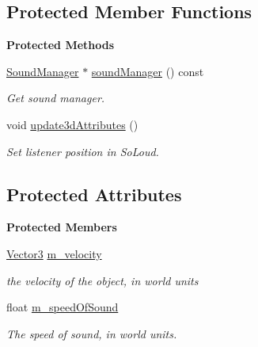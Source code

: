 \subsection*{Protected Member Functions}
\begin{Indent}\textbf{ Protected Methods}\par
\begin{DoxyCompactItemize}
\item 
\mbox{\label{classrev_1_1_audio_listener_component_a91da244fde04a60734fb0646785d573a}} 
\mbox{\hyperlink{classrev_1_1_sound_manager}{Sound\+Manager}} $\ast$ \mbox{\hyperlink{classrev_1_1_audio_listener_component_a91da244fde04a60734fb0646785d573a}{sound\+Manager}} () const
\begin{DoxyCompactList}\small\item\em Get sound manager. \end{DoxyCompactList}\item 
\mbox{\label{classrev_1_1_audio_listener_component_a1874d366bcf120fe0088e0936dda63a7}} 
void \mbox{\hyperlink{classrev_1_1_audio_listener_component_a1874d366bcf120fe0088e0936dda63a7}{update3d\+Attributes}} ()
\begin{DoxyCompactList}\small\item\em Set listener position in So\+Loud. \end{DoxyCompactList}\end{DoxyCompactItemize}
\end{Indent}
\subsection*{Protected Attributes}
\begin{Indent}\textbf{ Protected Members}\par
\begin{DoxyCompactItemize}
\item 
\mbox{\label{classrev_1_1_audio_listener_component_a833bfdf2c3435f29115e6a51dfbde74c}} 
\mbox{\hyperlink{classrev_1_1_vector}{Vector3}} \mbox{\hyperlink{classrev_1_1_audio_listener_component_a833bfdf2c3435f29115e6a51dfbde74c}{m\+\_\+velocity}}
\begin{DoxyCompactList}\small\item\em the velocity of the object, in world units \end{DoxyCompactList}\item 
\mbox{\label{classrev_1_1_audio_listener_component_aff1d8fcf22e4ac0729be321a1746a34a}} 
float \mbox{\hyperlink{classrev_1_1_audio_listener_component_aff1d8fcf22e4ac0729be321a1746a34a}{m\+\_\+speed\+Of\+Sound}}
\begin{DoxyCompactList}\small\item\em The speed of sound, in world units. \end{DoxyCompactList}\end{DoxyCompactItemize}
\end{Indent}

